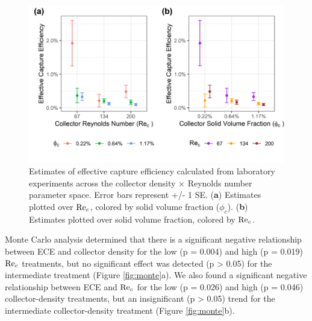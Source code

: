 \documentclass[geosciences,article,submit,moreauthors,pdftex]{Definitions/mdpi}
\begin{document}
\begin{figure}[H]
\centering
\includegraphics[width=5in]{../pics/ece_plot.png}
\caption{Estimates of effective capture efficiency calculated from laboratory experiments across the collector density $\times$ Reynolds number parameter space. Error bars represent +/- 1 SE. (\textbf{a}) Estimates plotted over $\mathrm{Re}_c$, colored by solid volume fraction ($\phi_c$). (\textbf{b}) Estimates plotted over solid volume fraction, colored by $\mathrm{Re}_c$.}
\label{fig:ece}
\end{figure}   

Monte Carlo analysis determined that there is a significant negative relationship between ECE and collector density for the low (p = 0.004) and high (p = 0.019) $\mathrm{Re}_c$ treatments, but no significant effect was detected (p > 0.05) for the intermediate treatment (Figure \ref{fig:monte}a). We also found a significant negative relationship between ECE and $\mathrm{Re}_c$ for the low (p = 0.026) and high (p = 0.046) collector-density treatments, but an insignificant (p > 0.05) trend for the intermediate collector-density treatment (Figure \ref{fig:monte}b). 
\end{document}
